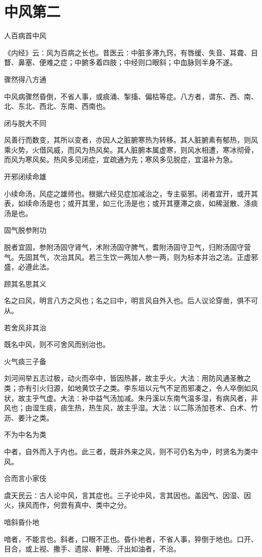 \documentclass[a4paper,12pt,UTF8,twoside]{ctexbook}
\begin{document}
	\chapter{中风第二}
	人百病首中风
	
	《内经》云∶风为百病之长也。昔医云∶中脏多滞九窍，有唇缓、失音、耳聋、目瞀、鼻塞、便难之症；中腑多着四肢；中经则口眼斜；中血脉则半身不遂。
	
	骤然得八方通
	
	中风病骤然昏倒，不省人事，或痰涌、掣搐、偏枯等症。八方者，谓东、西、南、北、东北、西北、东南、西南也。
	
	闭与脱大不同
	
	风善行而数变，其所以变者，亦因人之脏腑寒热为转移。其人脏腑素有郁热，则风乘火势，火借风威，而风为热风矣。其人脏腑本属虚寒，则风水相遭，寒冰彻骨，而风为寒风矣。热风多见闭症，宜疏通为先；寒风多见脱症，宜温补为急。
	
	开邪闭续命雄
	
	小续命汤，风症之雄师也。根据六经见症加减治之，专主驱邪。闭者宜开，或开其表，如续命汤是也；或开其里，如三化汤是也；或开其壅滞之痰，如稀涎散、涤痰汤是也。
	
	固气脱参附功
	
	脱者宜固，参附汤固守肾气，术附汤固守脾气，耆附汤固守卫气，归附汤固守营气。先固其气，次治其风。若三生饮一两加人参一两，则为标本并治之法。正虚邪盛，必遵此法。
	
	顾其名思其义
	
	名之曰风，明言八方之风也；名之曰中，明言风自外入也。后人议论穿凿，俱不可从。
	
	若舍风非其治
	
	既名中风，则不可舍风而别治也。
	
	火气痰三子备
	
	刘河间举五志过极，动火而卒中，皆因热甚，故主乎火。大法∶用防风通圣散之类；亦有引火归源，如地黄饮子之类。李东垣以元气不足而邪凑之，令人卒倒如风状，故主乎气虚。大法∶补中益气汤加减。朱丹溪以东南气温多湿，有病风者，非风也；由湿生痰，痰生热，热生风，故主乎湿。大法∶以二陈汤加苍术、白术、竹沥、姜汁之类。
	
	不为中名为类
	
	中者，自外而入于内也。此三者，既非外来之风，则不可仍名为中，时贤名为类中风。
	
	合而言小家伎
	
	虞天民云∶古人论中风，言其症也。三子论中风，言其因也。盖因气、因湿、因火，挟风而作，何尝有真中、类中之分。
	
	喑斜昏仆地
	
	喑者，不能言也。斜者，口眼不正也。昏仆地者，不省人事，猝倒于地也。口开、目合，或上视、撒手、遗尿、鼾睡、汗出如油者，不治。
	
\end{document}
